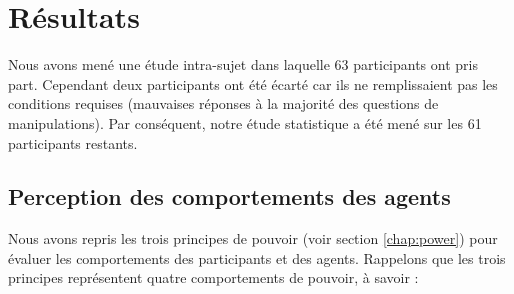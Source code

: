 \section{Résultats}
\label{sec:res}
	Nous avons mené une étude intra-sujet dans laquelle 63 participants ont pris part. Cependant deux participants ont été écarté car ils ne remplissaient pas les conditions requises (mauvaises réponses à la majorité des questions de manipulations). Par conséquent, notre étude statistique a été mené sur les 61 participants restants. 
		

	\subsection{Perception des comportements des agents}

	Nous avons repris les trois principes de pouvoir (voir section \ref{chap:power}) pour évaluer les comportements des participants et des agents. 
	Rappelons que les trois principes représentent quatre  comportements de pouvoir, à savoir :
	
